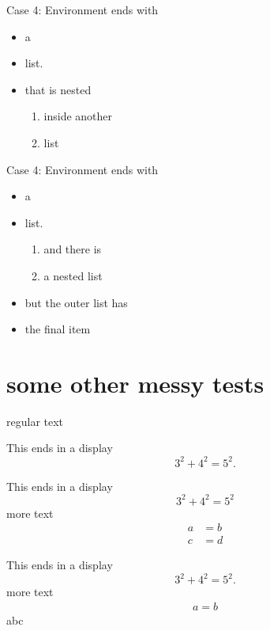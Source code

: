 \documentclass[leqno]{article}
\begin{document}
\begin{remark}
  Case 4: Environment ends with
  \begin{itemize}
  \item a
  \item list.
  \item that is nested
    \begin{enumerate}
    \item inside another
    \item list
    \end{enumerate}
  \end{itemize}
\end{remark}

\begin{note}
  Case 4: Environment ends with
  \begin{itemize}
  \item a
  \item list.
    \begin{enumerate}
    \item and there is
    \item a nested list
    \end{enumerate}
  \item but the outer list has
  \item the final item 
  \end{itemize}
\end{note}

\section{some other messy tests}
\begin{theorem}
regular text
\end{theorem}

\begin{theorem}
  This ends in a display
  \[
    3^2 + 4^2 = 5^2.
  \]
\end{theorem}

\begin{theorem}
  This ends in a display
  \[
    3^2 + 4^2 = 5^2
  \]
  more text
  \begin{align}
    a&=b \\
    c&=d
  \end{align}
\end{theorem}

\begin{theorem}
  This ends in a display
  \[
    3^2 + 4^2 = 5^2.
  \]
more text
\begin{align*}
a=b
\end{align*}
abc
\end{theorem}
\end{document}
